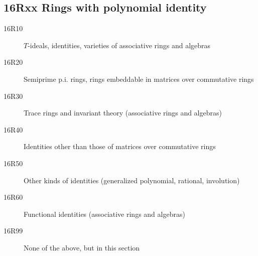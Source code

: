 \subsection*{16Rxx  Rings with polynomial identity}\label{16Rxx}
\begin{description}  
\item [16R10]\label{16R10} $T$-ideals, identities, varieties of associative rings and algebras
\item [16R20]\label{16R20} Semiprime p.i. rings, rings embeddable in matrices over commutative rings
\item [16R30]\label{16R30} Trace rings and invariant theory (associative rings and algebras)
\item [16R40]\label{16R40} Identities other than those of matrices over commutative rings
\item [16R50]\label{16R50} Other kinds of identities (generalized polynomial, rational, involution)
\item [16R60]\label{16R60} Functional identities (associative rings and algebras)
\item [16R99]\label{16R99} None of the above, but in this section
\end{description}
